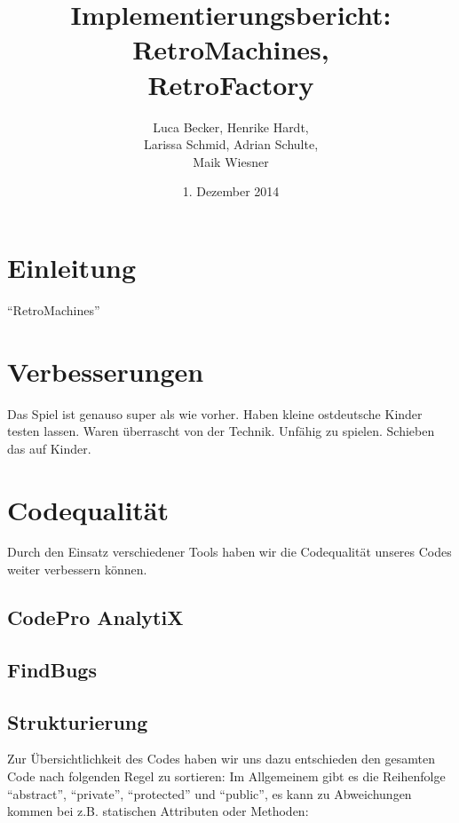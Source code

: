 \documentclass[parskip=full]{scrreprt}
\begin{document}
\title{Implementierungsbericht: RetroMachines, \\ RetroFactory}
\author{Luca Becker, Henrike Hardt,\\Larissa Schmid, Adrian Schulte,\\Maik Wiesner}
\date{1. Dezember 2014}
\maketitle
\thispagestyle{empty}

\clearpage

\thispagestyle{empty}
\tableofcontents
\thispagestyle{empty}

\clearpage
\setcounter{page}{1}

\chapter{Einleitung}

\enquote{RetroMachines}

\chapter{Verbesserungen}

Das Spiel ist genauso super als wie vorher. Haben kleine ostdeutsche Kinder testen lassen. Waren überrascht von der Technik. Unfähig zu spielen. Schieben das auf Kinder.

\chapter{Codequalität}

Durch den Einsatz verschiedener Tools haben wir die Codequalität unseres Codes weiter verbessern können.

\section{CodePro AnalytiX}



\section{FindBugs}


\section{Strukturierung}
Zur Übersichtlichkeit des Codes haben wir uns dazu entschieden den gesamten Code nach folgenden Regel zu sortieren: \newline
Im Allgemeinem gibt es die Reihenfolge "`abstract"', "`private"', "`protected"' und "`public"', es kann zu Abweichungen kommen bei z.B. statischen Attributen oder Methoden:
\end{document}
